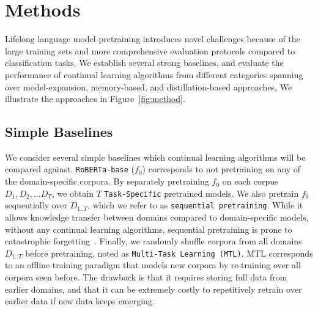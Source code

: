 \section{Methods}
\label{sec:methods}

Lifelong language model pretraining introduces novel challenges because of the large training sets and more comprehensive evaluation protocols compared to classification tasks. 
We establish several strong baselines, and evaluate the performance of continual learning algorithms from different categories spanning over model-expansion, memory-based, and distillation-based approaches, We illustrate the approaches in Figure~\ref{fig:method}. 

\vspace{-0.1cm}
\subsection{Simple Baselines}
\vspace{-0.1cm}
We consider several simple baselines which continual learning algorithms will be compared against. \texttt{RoBERTa-base} ($f_0$) corresponds to not pretraining on any of the domain-specific corpora. By separately pretraining $f_0$ on each corpus $D_1,D_2,...D_T$, we obtain $T$ \texttt{Task-Specific} pretrained models. 
We also pretrain $f_0$ sequentially over $D_{1..T}$, which we refer to as \texttt{sequential pretraining}. While it allows knowledge transfer between domains compared to domain-specific models, without any continual learning algorithms, sequential pretraining is prone to catastrophic forgetting~\cite{Robins1995CatastrophicFR}. Finally, we randomly shuffle corpora from all domains $D_{1..T}$ before pretraining, noted as \texttt{Multi-Task Learning (MTL)}. MTL corresponds to an offline training paradigm that models new corpora by re-training over all corpora seen before. The drawback is that it requires storing full data from earlier domains, and that it can be extremely costly to repetitively retrain over earlier data if new data keeps emerging.

